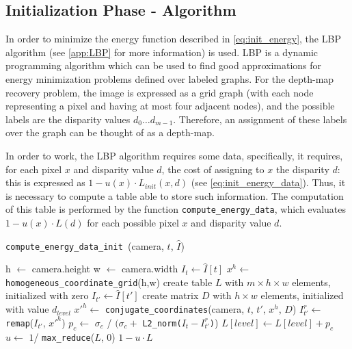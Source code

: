 \documentclass[notitlepage,english]{hgbreport}
\newcommand{\Acronym}[1]{{#1}}
\newcommand{\LBP}{\Acronym{LBP}}
\begin{document}
\subsection{Initialization Phase - Algorithm}\label{sec:init_phase_alg}
In order to minimize the energy function described in \cref{eq:init_energy}, the \LBP{} algorithm (see \cref{app:LBP} for more information) is used.
\LBP{} is a dynamic programming algorithm which can be used to find good approximations for energy minimization problems defined over labeled graphs.
For the depth-map recovery problem, the image is expressed as a grid graph (with each node representing a pixel and having at most four adjacent nodes), and the possible labels are the disparity values $d_0\dots d_{m-1}$. Therefore, an assignment of these labels over the graph can be thought of as a depth-map.

In order to work, the \LBP{} algorithm requires some data, specifically, it requires, for each pixel $x$ and disparity value $d$, the cost of assigning to $x$ the disparity $d$: this is expressed as $ 1- u(x)\cdot L_{init}(x,d)$ (see \cref{eq:init_energy_data}). Thus, it is necessary to compute a table able to store such information. 
The computation of this table is performed by the function \texttt{compute\_energy\_data}, which evaluates $1-u(x)\cdot L(d)$ for each possible pixel $x$ and disparity value $d$. 
\begin{algorithm}[H]
	\caption{\texttt{compute\_energy\_data\_init }(camera, $t$, $\hat I$)}
	\label{alg:energy_data_init}
\begin{algorithmic}[1]
	\State h $\leftarrow$ camera.height
	\State w $\leftarrow$ camera.width
	\State $I_t \leftarrow \hat I[ t ]$
	\State
	\State $x^h \leftarrow$ \texttt{homogeneous\_coordinate\_grid}(h,w)
	\State create table $L$ with $m\times h \times w$ elements, initialized with zero
	\State
		\State $I_{t'} \leftarrow \hat I[ t' ]$
		\State create matrix $D$ with $h \times w$ elements, initialized with value $d_{level}$
		\State $x'^h\leftarrow$ \texttt{conjugate\_coordinates}(camera, $t$,  $t'$, $x^h$, $D$)
		\State $I^r_{t'} \leftarrow$ \texttt{remap}($I_{t'}$, $x'^h$)
		\State
		\State $p_c \leftarrow$  $\sigma_c$ / $(\sigma_c +$ \texttt{L2\_norm($I_t - I^r_{t'}$)})
		\State $L[level] \leftarrow L[level] + p_c$
		\EndFor
	\EndFor
	\State
	\State $u \leftarrow$ $1$/ \texttt{max\_reduce}($L$, 0)
	\State \Return $1 - u\cdot L$
\end{algorithmic}
\end{algorithm}
\end{document}
